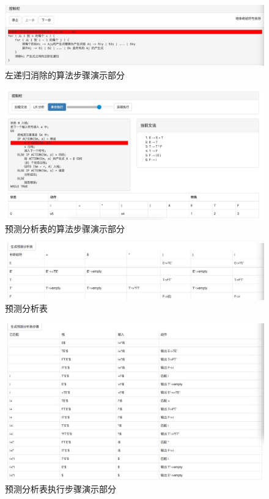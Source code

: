 \begin{figure}[!htb]
	\centering
	\includegraphics[width=1\linewidth]{img/leftrecursive2.png}
	\caption{左递归消除的算法步骤演示部分}
	\label{fig:leftrecursive2.png}
\end{figure}

\begin{figure}[!htb]
	\centering
	\includegraphics[width=1\linewidth]{img/tableanalyze.jpg}
	\caption{预测分析表的算法步骤演示部分}
	\label{fig:tableanalyze.jpg}
\end{figure}

\begin{figure}[!htb]
	\centering
	\includegraphics[width=1\linewidth]{img/table.png}
	\caption{预测分析表}
	\label{fig:table.png}
\end{figure}

\begin{figure}[!htb]
	\centering
	\includegraphics[width=1\linewidth]{img/tablegenerator.png}
	\caption{预测分析表执行步骤演示部分}
	\label{fig:tablegenerator.png}
\end{figure}

